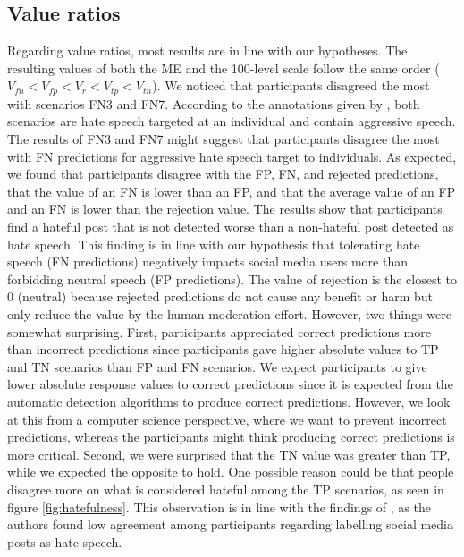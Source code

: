 \subsection{Value ratios}
\label{sec:discussion-value-ratios}
%
Regarding value ratios, most results are in line with our hypotheses.
%
The resulting values of both the ME and the 100-level scale follow the same order ($V_{fn} < V_{fp} < V_{r} < V_{tp} < V_{tn}$).
%
We noticed that participants disagreed the most with scenarios FN3 and FN7.
%
According to the annotations given by \citet{basile2019semeval}, both scenarios are hate speech targeted at an individual and contain aggressive speech.
%
The results of FN3 and FN7 might suggest that participants disagree the most with FN predictions for aggressive hate speech target to individuals.
%
As expected, we found that participants disagree with the FP, FN, and rejected predictions, that the value of an FN is lower than an FP, and that the average value of an FP and an FN is lower than the rejection value.
%
The results show that participants find a hateful post that is not detected worse than a non-hateful post detected as hate speech.
%
This finding is in line with our hypothesis that tolerating hate speech (FN predictions) negatively impacts social media users more than forbidding neutral speech (FP predictions).
%
The value of rejection is the closest to 0 (neutral) because rejected predictions do not cause any benefit or harm but only reduce the value by the human moderation effort.
%
However, two things were somewhat surprising.
%
First, participants appreciated correct predictions more than incorrect predictions since participants gave higher absolute values to TP and TN scenarios than FP and FN scenarios.
%
We expect participants to give lower absolute response values to correct predictions since it is expected from the automatic detection algorithms to produce correct predictions.
%
However, we look at this from a computer science perspective, where we want to prevent incorrect predictions, whereas the participants might think producing correct predictions is more critical.
%
Second, we were surprised that the TN value was greater than TP, while we expected the opposite to hold.
%
One possible reason could be that people disagree more on what is considered hateful among the TP scenarios, as seen in figure \ref{fig:hatefulness}.
%
This observation is in line with the findings of \citet{ross2017measuring}, as the authors found low agreement among participants regarding labelling social media posts as hate speech.
%

